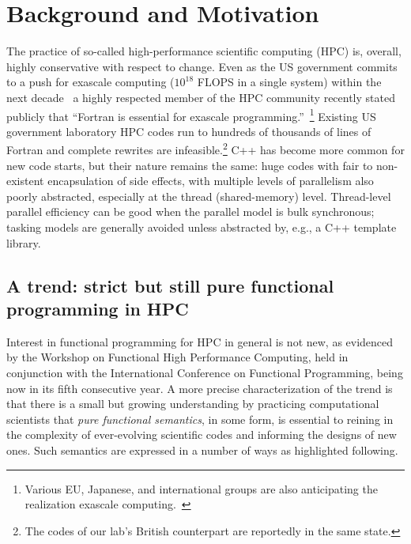\documentclass{llncs}
\begin{document}
\section{Background and Motivation}
The practice of so-called high-performance scientific computing (HPC) is,
overall, highly conservative with respect to change.  Even as the US
government commits to a push for exascale computing ($10^{18}$ FLOPS in a
single system) within the next decade~\cite{Exascale-roadmap} a highly
respected member of the HPC community recently stated publicly that ``Fortran
is essential for exascale programming.''~\cite{Heroux16}\footnote{Various EU,
  Japanese, and international groups are also anticipating the realization
  exascale computing.~\cite{EUexascale,Exascale-org}} Existing US government
laboratory HPC codes run to hundreds of thousands of lines of Fortran and
complete rewrites are infeasible.\footnote{The codes of our lab's British
  counterpart are reportedly in the same state.}  C++ has become more common
for new code starts, but their nature remains the same: huge codes with fair
to non-existent encapsulation of side effects, with multiple levels of
parallelism also poorly abstracted, especially at the thread (shared-memory)
level.  Thread-level parallel efficiency can be good when the parallel model
is bulk synchronous; tasking models are generally avoided unless abstracted
by, e.g., a C++ template library.

\subsection{A trend: strict but still pure functional programming in HPC}
Interest in functional programming for HPC in general is not new, as evidenced
by the Workshop on Functional High Performance Computing, held in conjunction
with the International Conference on Functional Programming, being now in its fifth
consecutive year.  A more precise characterization of the trend is that there
is a small but growing understanding by practicing computational scientists
that \emph{pure functional semantics}, in some form, is essential to reining
in the complexity of ever-evolving scientific codes and informing the
designs of new ones.  Such semantics are expressed in a number of ways as
highlighted following.
\end{document}
